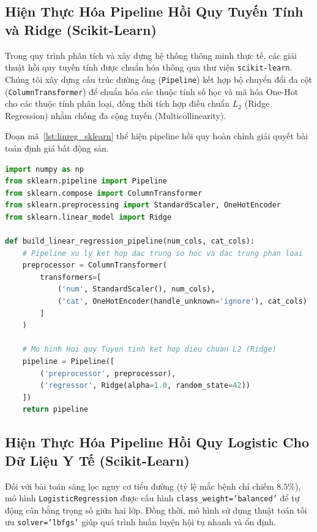 \documentclass[12pt,a4paper]{report}
\begin{document}
\subsection{Hiện Thực Hóa Pipeline Hồi Quy Tuyến Tính và Ridge (Scikit-Learn)}

Trong quy trình phân tích và xây dựng hệ thống thông minh thực tế, các giải thuật hồi quy tuyến tính được chuẩn hóa thông qua thư viện \texttt{scikit-learn}. Chúng tôi xây dựng cấu trúc đường ống (\texttt{Pipeline}) kết hợp bộ chuyển đổi đa cột (\texttt{ColumnTransformer}) để chuẩn hóa các thuộc tính số học và mã hóa One-Hot cho các thuộc tính phân loại, đồng thời tích hợp điều chuẩn $L_2$ (Ridge Regression) nhằm chống đa cộng tuyến (Multicollinearity).

Đoạn mã~\ref{lst:linreg_sklearn} thể hiện pipeline hồi quy hoàn chỉnh giải quyết bài toán định giá bất động sản.

\begin{lstlisting}[language=Python, caption={Pipeline Hồi quy Tuyến tính và Ridge với Scikit-Learn}, label={lst:linreg_sklearn}]
import numpy as np
from sklearn.pipeline import Pipeline
from sklearn.compose import ColumnTransformer
from sklearn.preprocessing import StandardScaler, OneHotEncoder
from sklearn.linear_model import Ridge

def build_linear_regression_pipeline(num_cols, cat_cols):
    # Pipeline xu ly ket hop dac trung so hoc va dac trung phan loai
    preprocessor = ColumnTransformer(
        transformers=[
            ('num', StandardScaler(), num_cols),
            ('cat', OneHotEncoder(handle_unknown='ignore'), cat_cols)
        ]
    )
    
    # Mo hinh Hoi quy Tuyen tinh ket hop dieu chuan L2 (Ridge)
    pipeline = Pipeline([
        ('preprocessor', preprocessor),
        ('regressor', Ridge(alpha=1.0, random_state=42))
    ])
    return pipeline
\end{lstlisting}

\subsection{Hiện Thực Hóa Pipeline Hồi Quy Logistic Cho Dữ Liệu Y Tế (Scikit-Learn)}

Đối với bài toán sàng lọc nguy cơ tiểu đường (tỷ lệ mắc bệnh chỉ chiếm $8.5\%$), mô hình \texttt{LogisticRegression} được cấu hình \texttt{class\_weight='balanced'} để tự động cân bằng trọng số giữa hai lớp. Đồng thời, mô hình sử dụng thuật toán tối ưu \texttt{solver='lbfgs'} giúp quá trình huấn luyện hội tụ nhanh và ổn định.
\end{document}
